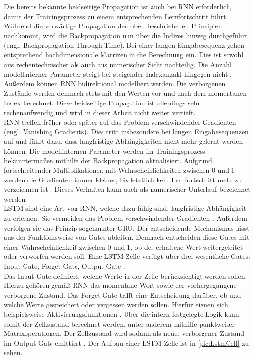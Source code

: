 \noindent
Die bereits bekannte beidseitige Propagation ist auch bei \ac{RNN} erforderlich, damit der Trainingsprozess zu einem entsprechenden Lernfortschritt führt. Während die vorwärtige Propagation den oben beschriebenen Prinzipien nachkommt, wird die Backpropagation nun über die Indizes hinweg durchgeführt (engl. Backpropagation Through Time). Bei einer langen Eingabesequenz gehen entsprechend hochdimensionale Matrizen in die Berechnung ein. Dies ist sowohl aus rechentechnischer als auch aus numerischer Sicht nachteilig. Die Anzahl modellinterner Parameter steigt bei steigender Indexanzahl hingegen nicht \cite[S.~328,~340]{ZHA20}.\\

\noindent
Außerdem können \ac{RNN} bidirektional modelliert werden. Die verborgenen Zustände werden demnach stets mit den Werten vor und nach dem momentanen Index berechnet. Diese beidseitige Propagation ist allerdings sehr rechenaufwendig und wird in dieser Arbeit nicht weiter vertieft.\\

\noindent
\ac{RNN} treffen früher oder später auf das Problem verschwindender Gradienten (engl. Vanishing Gradients). Dies tritt insbesondere bei langen Eingabesequenzen auf und führt dazu, dass langfristige Abhängigkeiten nicht mehr gelernt werden können. Die modellinternen Parameter werden im Trainingsprozess bekanntermaßen mithilfe der Backpropagation aktualisiert. Aufgrund fortschreitender Multiplikationen mit Wahrscheinlichkeiten zwischen 0 und 1 werden die Gradienten immer kleiner, bis letztlich kein Lernfortschritt mehr zu verzeichnen ist \cite{ARB18}. Dieses Verhalten kann auch als numerischer Unterlauf bezeichnet werden.\\

\noindent
\ac{LSTM} sind eine Art von \ac{RNN}, welche dazu fähig sind, langfristige Abhängigkeit zu erlernen. Sie vermeiden das Problem verschwindender Gradienten \cite{AIU19}. Außerdem verfolgen sie das Prinzip sogenannter \ac{GRU}. Der entscheidende Mechanismus lässt aus der Funktionsweise von Gates ableiten. Demnach entscheiden diese Gates mit einer Wahrscheinlichkeit zwischen 0 und 1, ob der erhaltene Wert weitergeleitet oder verworfen werden soll. Eine \ac{LSTM}-Zelle verfügt über drei wesentliche Gates: Input Gate, Forget Gate, Output Gate \cite[S.~347-348]{ZHA20}.\\

\noindent
Das Input Gate definiert, welche Werte in der Zelle berücksichtigt werden sollen. Hierzu gehören gemäß \ac{RNN} das momentane Wort sowie der vorhergegangene verborgene Zustand. Das Forget Gate trifft eine Entscheidung darüber, ob und welche Werte gespeichert oder vergessen werden sollen. Hierfür eignen sich beispielsweise Aktivierungsfunktionen \cite[S.~355]{ZHA20}. Über die intern festgelegte Logik kann somit der Zellzustand berechnet werden, unter anderem mithilfe punktweiser Matrixoperationen. Der Zellzustand wird sodann als neuer verborgener Zustand im Output Gate emittiert \cite{LUB18}. Der Aufbau einer \ac{LSTM}-Zelle ist in \autoref{pic:LstmCell} zu sehen.\\

